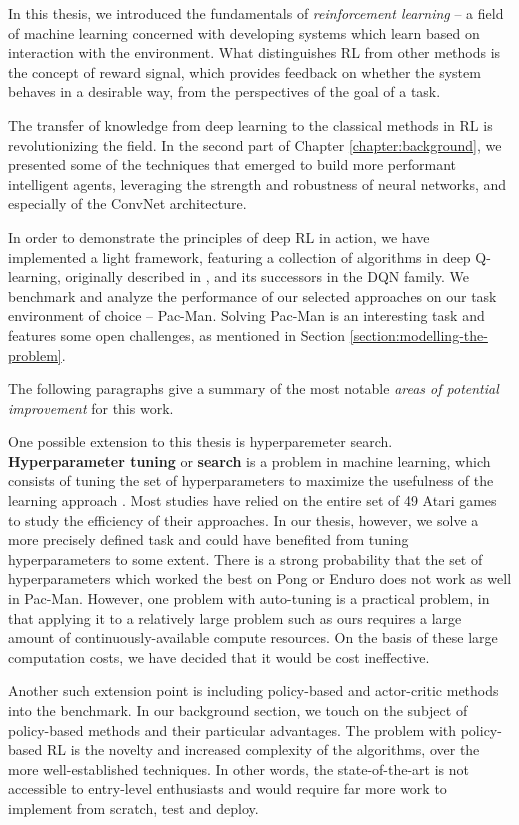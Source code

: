 In this thesis, we introduced the fundamentals of \emph{reinforcement learning} -- a field of machine learning concerned with developing systems which learn based on interaction with the environment.
What distinguishes RL from other methods is the concept of reward signal, which provides feedback on whether the system behaves in a desirable way, from the perspectives of the goal of a task.

The transfer of knowledge from deep learning to the classical methods in RL is revolutionizing the field.
In the second part of Chapter \ref{chapter:background}, we presented some of the techniques that emerged to build more performant intelligent agents, leveraging the strength and robustness of neural networks, and especially of the ConvNet architecture.

In order to demonstrate the principles of deep RL in action, we have implemented a light framework, featuring a collection of algorithms in deep Q-learning, originally described in \cite{atari-dqn}, and its successors in the DQN family.
We benchmark and analyze the performance of our selected approaches on our task environment of choice -- Pac-Man. Solving Pac-Man is an interesting task and features some open challenges, as mentioned in Section \ref{section:modelling-the-problem}.

The following paragraphs give a summary of the most notable \emph{areas of potential improvement} for this work.

One possible extension to this thesis is hyperparemeter search.
\textbf{Hyperparameter tuning} or \textbf{search} is a problem in machine learning, which consists of tuning the set of hyperparameters to maximize the usefulness of the learning approach \cite{hyperparam-search-paper}.
Most studies have relied on the entire set of 49 Atari games to study the efficiency of their approaches.
In our thesis, however, we solve a more precisely defined task and could have benefited from tuning hyperparameters to some extent.
There is a strong probability that the set of hyperparameters which worked the best on Pong or Enduro does not work as well in Pac-Man.
However, one problem with auto-tuning is a practical problem, in that applying it to a relatively large problem such as ours requires a large amount of continuously-available compute resources.
On the basis of these large computation costs, we have decided that it would be cost ineffective.

Another such extension point is including policy-based and actor-critic methods into the benchmark.
In our background section, we touch on the subject of policy-based methods and their particular advantages.
The problem with policy-based RL is the novelty and increased complexity of the algorithms, over the more well-established techniques.
In other words, the state-of-the-art is not accessible to entry-level enthusiasts and would require far more work to implement from scratch, test and deploy.

